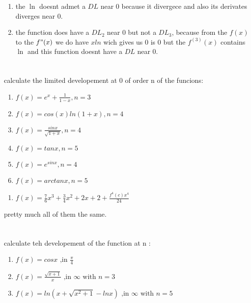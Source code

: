 \documentclass[12pt]{article}
\begin{document}
\begin{correctionbox}
	\begin{enumerate}
		\item the $\ln$ doesnt admet a $DL$ near $0$ because it divergece and also its derivates diverges near $0$.
		\item the function does have a $DL_2$ near $0$ but not a $DL_3$, because from the $f(x)$ to the $f"(x)$ we do have $xln$ wich gives us $0$ is $0$ but the $f^{(3)}(x)$ contains $\ln$ and this function doesnt have a $DL$ near $0$.
	\end{enumerate}
\end{correctionbox}

\section{}
calculate the limited developement at 0 of order n of the funcions:
\begin{enumerate}
	\item $f(x) = e^x + \frac{1}{1-x}, n = 3$
	\item $f(x) = cos(x) ln(1+x), n=4$
	\item $f(x) = \frac{sin x }{\sqrt{1+x}}, n = 4$
	\item $f(x) = tan x, n = 5$
	\item $f(x) = e^{sin x} , n =4$
	\item $f(x) = arctan x, n=5$
\end{enumerate}

\begin{correctionbox}
	\begin{enumerate}
		\item $f(x) = \frac{7}{6}x^3 + \frac{3}{4}x^2 + 2x +2 + \frac{f^{4}(c) x^4}{24}$
	\end{enumerate}
	pretty much all of them the same.
\end{correctionbox}

\section{}
calculate teh developement of the function at n :
\begin{enumerate}
	\item $f(x) = cos x \text{ ,in } \frac{\pi}{4}$
	\item $f(x) = \frac{\sqrt{x+1}}{x} \text{ ,in } \infty \text{ with } n = 3$
	\item $f(x) = ln(x+ \sqrt{x^2+1} - ln x) \text{ ,in } \infty \text{ with } n = 5$
\end{enumerate}
\end{document}
